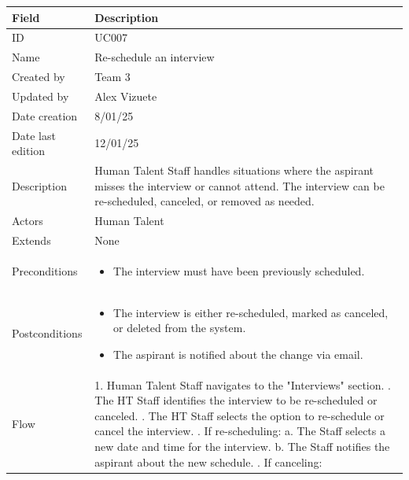 \documentclass{scrreprt}
\begin{document}
\begin{table}[H]
	\centering
	\begin{tabular}{|p{3cm}|p{10cm}|}
		\hline
		\textbf{Field} & \textbf{Description} \\ \hline
		ID & UC007 \\ \hline
		Name & Re-schedule an interview \\ \hline
		Created by & Team 3 \\ \hline
		Updated by & Alex Vizuete \\ \hline
		Date creation & 8/01/25 \\ \hline
		Date last edition & 12/01/25 \\ \hline
		Description & Human Talent Staff handles situations where the aspirant misses the interview or cannot attend. The interview can be re-scheduled, canceled, or removed as needed. \\ \hline
		Actors & Human Talent \\ \hline
		Extends & None \\ \hline
		Preconditions & 
		\begin{itemize}
			\item The interview must have been previously scheduled.
		\end{itemize} \\ \hline
		Postconditions & 
		\begin{itemize}
			\item The interview is either re-scheduled, marked as canceled, or deleted from the system.
			\item The aspirant is notified about the change via email. 
		\end{itemize} \\ \hline
		Flow & 
		1. Human Talent Staff navigates to the "Interviews" section. \newline
		2. The HT Staff identifies the interview to be re-scheduled or canceled. \newline
		3. The HT Staff selects the option to re-schedule or cancel the interview. \newline
		4. If re-scheduling: \newline
		\hspace*{0.5cm} a. The Staff selects a new date and time for the interview. \newline
		\hspace*{0.5cm} b. The Staff notifies the aspirant about the new schedule. \newline
		5. If canceling: \newline

\end{tabular}
\end{table}
\end{document}
